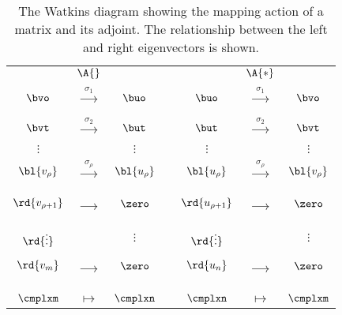 \begin{table}[htdp]
\caption[The Watkins diagram]{The Watkins diagram showing the mapping action of a matrix and its adjoint. The relationship between the left and right eigenvectors is shown.}
\begin{center}
\begin{tabular}{ccccccc}
%
  & $\A{}$ &&&& $\A{*}$ \\
%
  $\bvo$ & $\xrightarrow[]{ \phantom{1} \sigma_{1} \phantom{1} }$ & $\buo$ & &
  $\buo$ & $\xrightarrow[]{ \phantom{1} \sigma_{1} \phantom{1} }$ & $\bvo$ \\
%
  $\bvt$ & $\xrightarrow[]{ \phantom{1} \sigma_{2} \phantom{1} }$ & $\but$ & &
  $\but$ & $\xrightarrow[]{ \phantom{1} \sigma_{2} \phantom{1} }$ & $\bvt$ \\
%
  $\vdots$ & & $\vdots$ & & $\vdots$ &  & $\vdots$ \\
%
  ${\bl{ v_{\rho} }}$ & $\xrightarrow[]{ \phantom{1} \sigma_{\rho} \phantom{1} }$ & ${\bl{ u_{\rho} }}$ & &
  ${\bl{ u_{\rho} }}$ & $\xrightarrow[]{ \phantom{1} \sigma_{\rho} \phantom{1} }$ & ${\bl{ v_{\rho} }}$ \\[10pt]
%
%
  ${\rd{ v_{\rho+1} }}$ & $\xrightarrow[]{ \phantom{1} \phantom{\sigma_{\rho}} \phantom{1} }$ & $\zero$ & & 
  ${\rd{ u_{\rho+1} }}$ & $\xrightarrow[]{ \phantom{1} \phantom{\sigma_{\rho}} \phantom{1} }$ & $\zero$ \\ \\
%
  ${\rd {\vdots }}$ & & $\vdots$ & & ${\rd {\vdots }}$ &  & $\vdots$ \\
%
  ${\rd{ v_{m} }}$ & $\xrightarrow[]{ \phantom{1} \phantom{\sigma_{\rho}} \phantom{1} }$ & $\zero$ & & 
  ${\rd{ u_{n} }}$ & $\xrightarrow[]{ \phantom{1} \phantom{\sigma_{\rho}} \phantom{1} }$ & $\zero$ \\ \\\hline \\
%
  $\cmplxm$ & $\mapsto$ & $\cmplxn$ && $\cmplxn$ & $\mapsto$ & $\cmplxm$
%
\end{tabular}
\end{center}
\label{tab:svd I:watkins}
\end{table}%


\endinput